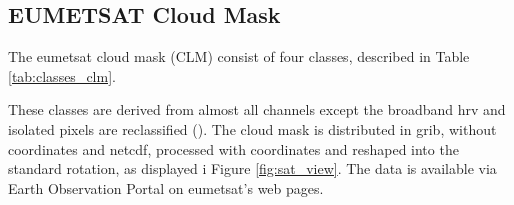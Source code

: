\subsection{EUMETSAT Cloud Mask} \label{sec:EUMETSAT_cloud_mask}
The \acrshort{eumetsat} cloud mask (CLM) consist of four classes, described in Table \ref{tab:classes_clm}.

These classes are derived from almost all channels except the broadband \acrfull{hrv} and isolated pixels are reclassified (\cite{Tavarat10_Derrien}). The cloud mask is distributed in \acrfull{grib},  without coordinates and \acrfull{netcdf}, processed with coordinates and reshaped into the standard rotation, as displayed i Figure \ref{fig:sat_view}. The data is available via Earth Observation Portal on \acrshort{eumetsat}'s web pages. 

